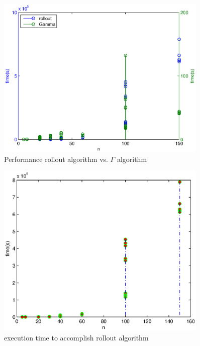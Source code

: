 \begin{figure}[!htbp]
  \begin{center}
   \includegraphics[width=0.9\textwidth]{Images/Chapter5/ra_gamma_time.eps}
  \end{center}
    \caption{Performance rollout algorithm vs. $\Gamma$ algorithm}\label{fig:ra_gamma_time}
\end{figure}

\begin{figure}[!htbp]
  \begin{center}
   \includegraphics[width=0.9\textwidth]{Images/Chapter5/ra_time.eps}
  \end{center}
    \caption{execution time to accomplish rollout algorithm}\label{fig:expected_distance3D_time}
\end{figure}

